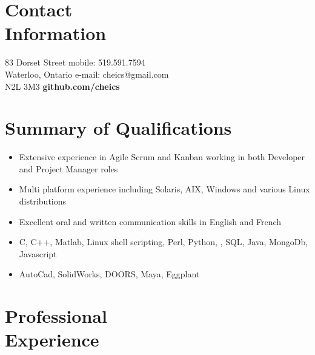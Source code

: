 \documentclass[margin,line]{resume}
\begin{document}
\begin{resume}

    \section{\mysidestyle Contact\\Information}

    83 Dorset Street                            \hfill mobile: 519.591.7594         \vspace{0mm}\\\vspace{0mm}%
    Waterloo, Ontario                          \hfill  e-mail: cheics@gmail.com         \vspace{0mm}\\\vspace{0mm}%
    N2L 3M3      \hfill     \textbf{github.com/cheics} \vspace{0mm}\\\vspace{-4.5mm}%


    \section{\mysidestyle Summary of Qualifications} 
	\begin{itemize}
	\item{Extensive experience in Agile Scrum and Kanban working in both Developer and Project Manager roles}
	\item{Multi platform experience including Solaris, AIX, Windows and various Linux distributions}
	\item{Excellent oral and written communication skills in English and French}
	\item{C, C++, Matlab, Linux shell scripting, Perl, Python, \LaTeXe, SQL, Java, MongoDb, Javascript}
	\item{AutoCad, SolidWorks, DOORS, Maya, Eggplant}
	\end{itemize}
    

    \section{\mysidestyle Professional\\Experience}


\end{resume}
\end{document}
